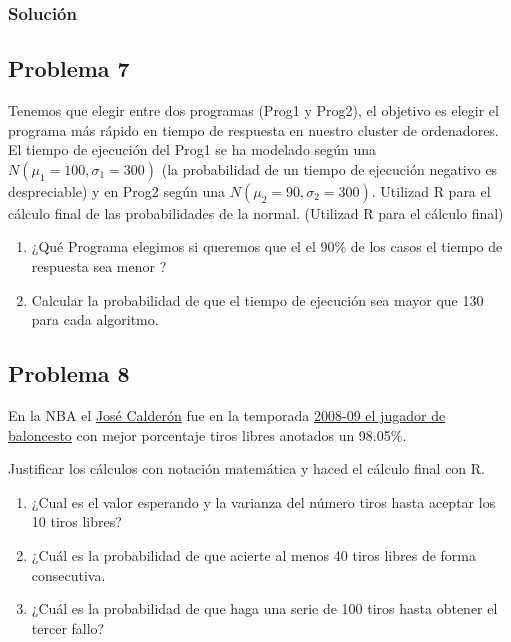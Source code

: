 \documentclass[
]{article}
\providecommand{\tightlist}{%
  \setlength{\itemsep}{0pt}\setlength{\parskip}{0pt}}
\begin{document}
\hypertarget{soluciuxf3n-5}{%
\subsubsection{Solución}\label{soluciuxf3n-5}}

\hypertarget{problema-7}{%
\subsection{Problema 7}\label{problema-7}}

Tenemos que elegir entre dos programas (Prog1 y Prog2), el objetivo es
elegir el programa más rápido en tiempo de respuesta en nuestro cluster
de ordenadores. El tiempo de ejecución del Prog1 se ha modelado según
una \(N(\mu_1=100, \sigma_1=300)\) (la probabilidad de un tiempo de
ejecución negativo es despreciable) y en Prog2 según una
\(N(\mu_2=90, \sigma_2=300)\). Utilizad R para el cálculo final de las
probabilidades de la normal. (Utilizad R para el cálculo final)

\begin{enumerate}
\def\labelenumi{\arabic{enumi}.}
\tightlist
\item
  ¿Qué Programa elegimos si queremos que el el 90\% de los casos el
  tiempo de respuesta sea menor ?
\item
  Calcular la probabilidad de que el tiempo de ejecución sea mayor que
  130 para cada algoritmo.
\end{enumerate}

\hypertarget{problema-8}{%
\subsection{Problema 8}\label{problema-8}}

En la NBA el
\href{https://es.wikipedia.org/wiki/Jos\%C3\%A9_Manuel_Calder\%C3\%B3n}{José
Calderón} fue en la temporada
\href{https://es.wikipedia.org/wiki/L\%C3\%ADderes_en_porcentaje_de_tiros_libres_de_la_NBA}{2008-09
el jugador de baloncesto} con mejor porcentaje tiros libres anotados un
98.05\%.

Justificar los cálculos con notación matemática y haced el cálculo final
con R.

\begin{enumerate}
\def\labelenumi{\arabic{enumi}.}
\tightlist
\item
  ¿Cual es el valor esperando y la varianza del número tiros hasta
  aceptar los 10 tiros libres?
\item
  ¿Cuál es la probabilidad de que acierte al menos 40 tiros libres de
  forma consecutiva.
\item
  ¿Cuál es la probabilidad de que haga una serie de 100 tiros hasta
  obtener el tercer fallo?
\end{enumerate}
\end{document}
